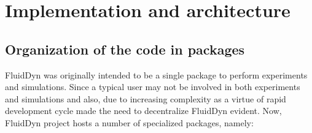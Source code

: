 \section{Implementation and architecture}


\subsection*{Organization of the code in packages}

FluidDyn was originally intended to be a single package to perform experiments
and simulations. Since a typical user may not be involved in both experiments
and simulations and also, due to increasing complexity as a virtue of rapid
development cycle made the need to decentralize FluidDyn evident.
Now, FluidDyn project hosts a number of specialized packages, namely:

